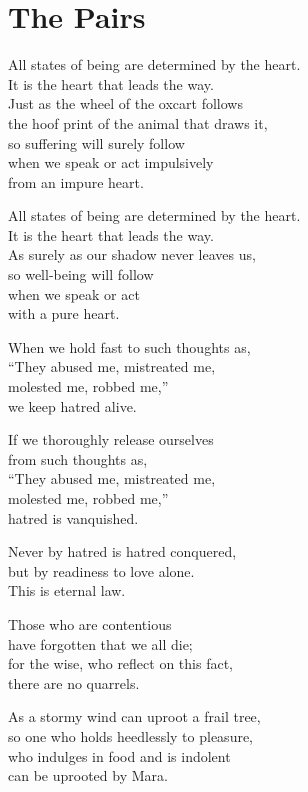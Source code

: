 
\chapter{The Pairs}

All states of being are determined by the heart.\\
It is the heart that leads the way.\\
Just as the wheel of the oxcart follows\\
the hoof print of the animal that draws it,\\
so suffering will surely follow\\
when we speak or act impulsively\\
from an impure heart.


All states of being are determined by the heart.\\
It is the heart that leads the way.\\
As surely as our shadow never leaves us,\\
so well-being will follow\\
when we speak or act\\
with a pure heart.


When we hold fast to such thoughts as,\\
“They abused me, mistreated me,\\
molested me, robbed me,”\\
we keep hatred alive.


If we thoroughly release ourselves\\
from such thoughts as,\\
“They abused me, mistreated me,\\
molested me, robbed me,”\\
hatred is vanquished.


Never by hatred is hatred conquered,\\
but by readiness to love alone.\\
This is eternal law.

Those who are contentious\\
have forgotten that we all die;\\
for the wise, who reflect on this fact,\\
there are no quarrels.

As a stormy wind can uproot a frail tree,\\
so one who holds heedlessly to pleasure,\\
who indulges in food and is indolent\\
can be uprooted by Mara.


